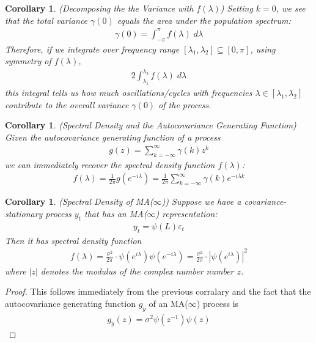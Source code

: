 \documentclass[12pt]{article}
\theoremstyle{plain}
\newtheorem{cor}[thm]{Corollary}
\theoremstyle{definition}
\theoremstyle{remark}
\begin{document}
\clearpage
\begin{cor}\emph{(Decomposing the the Variance with $f(\lambda)$)}
Setting $k=0$, we see that the total variance $\gamma(0)$ equals the
area under the population spectrum:
\begin{align*}
  \gamma(0) = \int_{-\pi}^\pi f(\lambda) \; d\lambda
\end{align*}
Therefore, if we integrate over frequency range
$[\lambda_1,\lambda_2]\subseteq[0,\pi]$,
using symmetry of $f(\lambda)$,
\begin{align*}
  2\int_{\lambda_1}^{\lambda_2} f(\lambda) \; d\lambda
\end{align*}
this integral tells us how much oscillations/cycles with frequencies
$\lambda \in[\lambda_1,\lambda_2]$ contribute to the overall variance
$\gamma(0)$ of the process.
\end{cor}


\begin{cor}
\emph{(Spectral Density and the Autocovariance Generating Function)}
Given the autocovariance generating function of a process
\begin{align*}
  g(z)=\sum_{k=-\infty}^\infty \gamma(k)z^k
\end{align*}
we can immediately recover the spectral density function $f(\lambda)$:
\begin{align*}
  f(\lambda) = \frac{1}{2\pi} g(e^{-i\lambda})
  = \frac{1}{2\pi} \sum_{k=-\infty}^\infty \gamma(k) e^{-i\lambda k}
\end{align*}
\end{cor}

\begin{cor}\emph{(Spectral Density of MA($\infty$))}
Suppose we have a covariance-stationary process $y_t$ that has an
MA($\infty$) representation:
\begin{align*}
  y_t = \psi(L)\varepsilon_t
\end{align*}
Then it has spectral density function
\begin{align*}
  f(\lambda) = \frac{\sigma^2}{2\pi}\cdot
  \psi(e^{i\lambda})\psi(e^{-i\lambda})
  = \frac{\sigma^2}{2\pi}\cdot
  \left\lvert
  \psi(e^{i\lambda})
  \right\rvert^2
\end{align*}
where $|z|$ denotes the modulus of the complex number number $z$.
\end{cor}
\begin{proof}
This follows immediately from the previous corralary and the fact that
the autocovariance generating function $g_y$ of an MA($\infty$) process
is
\begin{align*}
  g_y(z) = \sigma^2 \psi(z^{-1})\psi(z)
\end{align*}
\end{proof}
\end{document}
